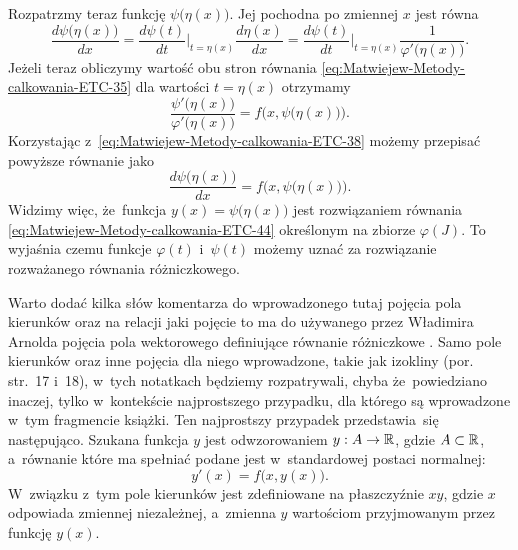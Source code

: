 \documentclass[a4paper,11pt]{article}
\numberwithin{equation}{section}
\begin{document}
Rozpatrzmy teraz funkcję $\psi\big( \eta( x ) \big)$. Jej pochodna po zmiennej $x$
jest równa
\begin{equation}
  \label{eq:Uwagi-do-konkrentych-stron-24}
  \frac{ d \psi\big( \eta( x ) \big) }{ d x } =
  \frac{ d \psi( t ) }{ d t }\bigg|_{ t = \eta( x ) }
  \frac{ d \eta( x ) }{ d x } =
  \frac{ d \psi( t ) }{ d t }\bigg|_{ t = \eta( x ) }
  \frac{ 1 }{ \varphi'\big( \eta( x ) \big)}.
\end{equation}
Jeżeli teraz obliczymy wartość obu stron równania
\eqref{eq:Matwiejew-Metody-calkowania-ETC-35} dla wartości $t = \eta( x )$
otrzymamy
\begin{equation}
  \label{eq:Uwagi-do-konkrentych-stron-25}
  \frac{ \psi'\big( \eta( x ) \big) }{ \varphi'\big( \eta( x ) \big) } =
  f\Big( x, \psi\big( \eta( x ) \big) \Big).
\end{equation}
Korzystając z~\eqref{eq:Matwiejew-Metody-calkowania-ETC-38} możemy przepisać
powyższe równanie jako
\begin{equation}
  \label{eq:Uwagi-do-konkrentych-stron-26}
  \frac{ d \psi\big( \eta( x ) \big) }{ d x } =
  f\Big( x, \psi\big( \eta( x ) \big) \big).
\end{equation}
Widzimy więc, że~funkcja $y( x ) = \psi\big( \eta( x ) \big)$ jest rozwiązaniem
równania \eqref{eq:Matwiejew-Metody-calkowania-ETC-44} określonym na zbiorze
$\varphi( J )$. To wyjaśnia czemu funkcje $\varphi( t )$ i~$\psi( t )$ możemy uznać za
rozwiązanie rozważanego równania różniczkowego.

\VerSpaceFour





\noindent
{} Warto dodać kilka słów komentarza do wprowadzonego tutaj
pojęcia pola kierunków oraz na relacji jaki pojęcie to ma do używanego
przez Władimira Arnolda pojęcia pola wektorowego definiujące równanie
różniczkowe \cite{ArnoldRownaniaRozniczkoweZwyczajne1975}. Samo pole
kierunków oraz inne pojęcia dla niego wprowadzone, takie jak izokliny
(por. str.~17 i~18), w~tych notatkach będziemy rozpatrywali, chyba
że~powiedziano inaczej, tylko w~kontekście najprostszego przypadku, dla
którego są wprowadzone w~tym fragmencie książki. Ten najprostszy przypadek
przedstawia~się następująco. Szukana funkcja $y$ jest odwzorowaniem
$y : A \to \mathbb{R}$, gdzie $A \subset \mathbb{R}$, a~równanie które ma spełniać podane
jest w~standardowej postaci normalnej:
\begin{equation}
  \label{eq:Uwagi-do-konkrentych-stron-27}
  y'( x ) = f\big( x, y( x ) \big).
\end{equation}
W~związku z~tym pole kierunków jest zdefiniowane na płaszczyźnie $xy$,
gdzie $x$ odpowiada zmiennej niezależnej, a~zmienna $y$ wartościom
przyjmowanym przez funkcję $y( x )$.
\end{document}
